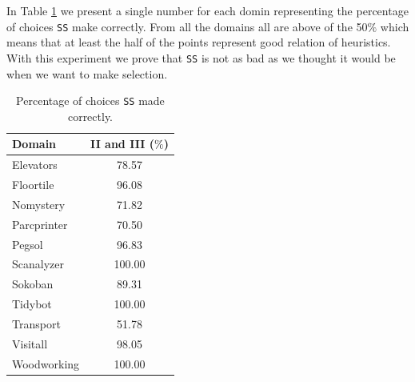 \newpage

In Table \ref{tb:per_ss_made_correctly} we present a single number for each domin representing the percentage of choices \texttt{SS} make correctly. From all the domains all are above of the 50$\%$ which means that at least the half of the points represent good relation of heuristics. With this experiment we prove that \texttt{SS} is not as bad as we thought it would be when we want to make selection.

\begin{table}[!htb]
\centering
\begin{tabular}{lc}
\hline
Domain      & II and III ($\%$) \\ \hline
Elevators   & 78.57    \\
Floortile   & 96.08    \\
Nomystery   & 71.82    \\
Parcprinter & 70.50    \\
Pegsol      & 96.83    \\
Scanalyzer  & 100.00   \\
Sokoban     & 89.31    \\
Tidybot     & 100.00   \\
Transport   & 51.78    \\
Visitall    & 98.05    \\
Woodworking & 100.00   \\ \hline
\end{tabular}
\caption{Percentage of choices \texttt{SS} made correctly.}
\label{tb:per_ss_made_correctly}
\end{table}

\clearpage